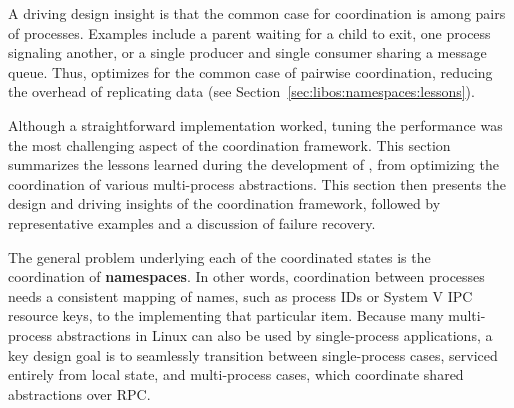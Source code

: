 A driving design insight is that the common case
for coordination is among pairs of processes.
Examples include a parent waiting for a child to exit, 
one process signaling another, or a single producer and single consumer
sharing a message queue.
Thus, \graphene{} optimizes for the common case of pairwise coordination,
reducing the overhead of replicating data (see Section~\ref{sec:libos:namespaces:lessons}).



Although a straightforward implementation worked, tuning the performance was the most challenging aspect of the coordination framework. 
This section summarizes the lessons learned during the development of \graphene{}, from optimizing the coordination of various multi-process abstractions.
This section then
presents the design and driving insights of the coordination framework,
followed by representative examples 
and a discussion of failure recovery.

\label{sec:libos:namespaces:building-blocks}

The general problem underlying each of the coordinated \libos{} states is 
the coordination of {\bf namespaces}.  In other words, coordination between processes needs 
a consistent mapping of names, such as process IDs or System V IPC resource keys, 
to the \picoproc{} implementing that particular item.  
Because many multi-process abstractions in Linux can also be used by single-process applications,
a key design goal is to seamlessly transition between single-process cases, serviced 
entirely from local \libos{} state, and multi-process cases, which coordinate shared abstractions over RPC.


